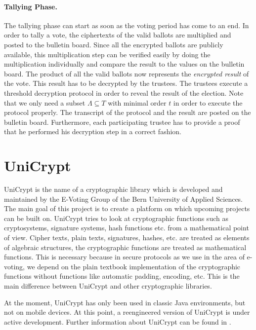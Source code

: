 \documentclass[numbers=noenddot, abstract=on, a4paper, headsepline,
footsepline, oneside, draft=off]{scrreprt}
\begin{document}
\paragraph{Tallying Phase.}
The tallying phase can start as soon as the voting period has come to an end. In
order to tally a vote, the ciphertexts of the valid ballots are multiplied
and posted to the bulletin board. Since all the encrypted ballots are publicly
available, this multiplication step can be verified easily by doing the
multiplication individually and compare the result to the values on the
bulletin board. The product of all the valid ballots now represents the
\emph{encrypted result} of the vote. This result has to be decrypted by the
trustees. The trustees execute a threshold decryption
protocol in order to reveal the result of the election. Note that we only need a subset $\Lambda \subseteq T$ with minimal order $t$ in order to execute the
protocol properly. The transcript of the protocol and the result are posted on
the bulletin board. Furthermore, each participating trustee has to provide a
proof that he performed his decryption step in a correct fashion.

\section{UniCrypt}
\label{sec:unicrypt}
UniCrypt is the name of a cryptographic library which is developed and
maintained by the E-Voting Group of the Bern University of Applied Sciences. The
main goal of this project is to create a platform on which upcoming projects can
be built on.
UniCrypt tries to look at cryptographic functions such as cryptosystems,
signature systems, hash functions etc. from a mathematical point of view. Cipher
texts, plain texts, signatures, hashes, etc. are treated as elements of
algebraic structures, the cryptographic functions are treated as mathematical functions.
This is necessary because in secure protocols as we use in the area of e-voting,
we depend on the plain textbook implementation of the cryptographic functions
without functions like automatic padding, encoding, etc. This is the main
difference between UniCrypt and other cryptographic libraries.

At the moment, UniCrypt has only been used in classic Java environments, but not
on mobile devices. At this point, a reengineered version of UniCrypt is under
active development. Further information about UniCrypt can be found in \cite{ritter12}.
\end{document}
